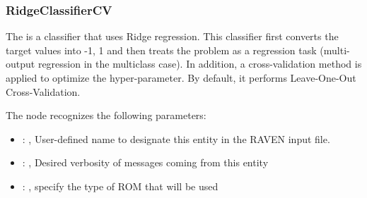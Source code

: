 \subsubsection{RidgeClassifierCV}
  The  is a classifier that uses Ridge regression.
  This classifier first converts the target values into {-1, 1} and then treats
  the problem as a regression task (multi-output regression in the multiclass case).
  In addition, a cross-validation method is applied to optimize the hyper-parameter.
  By default, it performs Leave-One-Out Cross-Validation.

  The  node recognizes the following parameters:
    \begin{itemize}
      \item {}: , 
        User-defined name to designate this entity in the RAVEN input file.
      \item {}: , 
        Desired verbosity of messages coming from this entity
      \item {}: , 
        specify the type of ROM that will be used
  \end{itemize}

